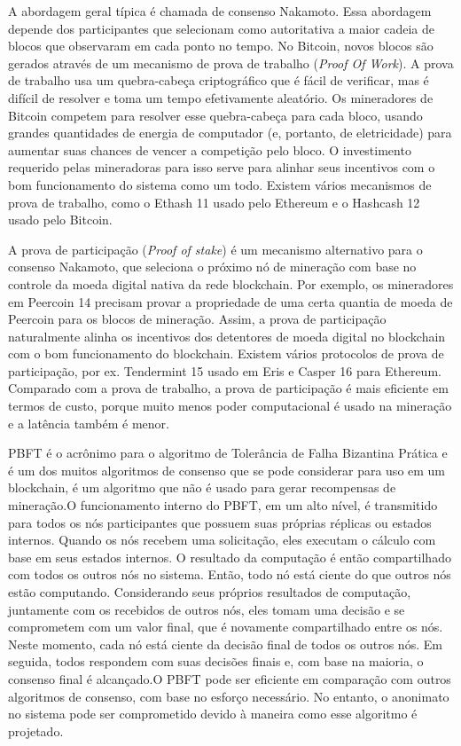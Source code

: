            A abordagem geral típica é chamada de consenso Nakamoto. Essa abordagem depende dos participantes que selecionam como autoritativa a maior cadeia de blocos que observaram em cada ponto no tempo. No Bitcoin, novos blocos são gerados através de um mecanismo de prova de trabalho (\textit{Proof Of Work}). A prova de trabalho usa um quebra-cabeça criptográfico que é fácil de verificar, mas é difícil de resolver e toma um tempo efetivamente aleatório. Os mineradores de Bitcoin competem para resolver esse quebra-cabeça para cada bloco, usando grandes quantidades de energia de computador (e, portanto, de eletricidade) para aumentar suas chances de vencer a competição pelo bloco. O investimento requerido pelas mineradoras para isso serve para alinhar seus incentivos com o bom funcionamento do sistema como um todo. Existem vários mecanismos de prova de trabalho, como o Ethash 11 usado pelo Ethereum e o Hashcash 12 usado pelo Bitcoin.\cite{architecture_for_blockchain}
            
            A prova de participação (\textit{Proof of stake}) é um mecanismo alternativo para o consenso Nakamoto, que seleciona o próximo nó de mineração com base no controle da moeda digital nativa da rede blockchain. Por exemplo, os mineradores em Peercoin 14 precisam provar a propriedade de uma certa quantia de moeda de Peercoin para os blocos de mineração. Assim, a prova de participação naturalmente alinha os incentivos dos detentores de moeda digital no blockchain com o bom funcionamento do blockchain. Existem vários protocolos de prova de participação, por ex. Tendermint 15 usado em Eris e Casper 16 para Ethereum. Comparado com a prova de trabalho, a prova de participação é mais eficiente em termos de custo, porque muito menos poder computacional é usado na mineração e a latência também é menor.\cite{architecture_for_blockchain}
            
            PBFT é o acrônimo para o algoritmo de Tolerância de Falha Bizantina Prática e é um dos muitos algoritmos de consenso que se pode considerar para uso em um blockchain, é um algoritmo que não é usado para gerar recompensas de mineração.O funcionamento interno do PBFT, em um alto nível, é transmitido para todos os nós participantes que possuem suas próprias réplicas ou estados internos. Quando os nós recebem uma solicitação, eles executam o cálculo com base em seus estados internos. O resultado da computação é então compartilhado com todos os outros nós no sistema. Então, todo nó está ciente do que outros nós estão computando. Considerando seus próprios resultados de computação, juntamente com os recebidos de outros nós, eles tomam uma decisão e se comprometem com um valor final, que é novamente compartilhado entre os nós. Neste momento, cada nó está ciente da decisão final de todos os outros nós. Em seguida, todos respondem com suas decisões finais e, com base na maioria, o consenso final é alcançado.O PBFT pode ser eficiente em comparação com outros algoritmos de consenso, com base no esforço necessário. No entanto, o anonimato no sistema pode ser comprometido devido à maneira como esse algoritmo é projetado. \cite{beginnig_blockchain_bikramaditya}

